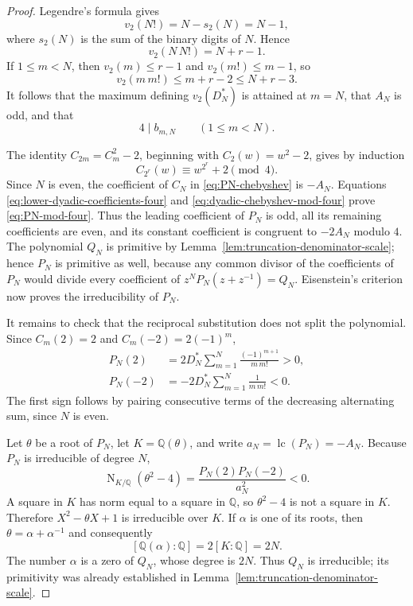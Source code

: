 \documentclass[11pt]{article}
\theoremstyle{definition}
\theoremstyle{remark}
\newcommand{\Q}{\mathbb Q}
\begin{document}
\begin{proof}
Legendre's formula gives
\[
 v_2(N!)=N-s_2(N)=N-1,
\]
where \(s_2(N)\) is the sum of the binary digits of \(N\).  Hence
\begin{equation}\label{eq:dyadic-top-valuation}
 v_2(N\,N!)=N+r-1.
\end{equation}
If \(1\leq m<N\), then \(v_2(m)\leq r-1\) and
\(v_2(m!)\leq m-1\), so
\[
 v_2(m\,m!)\leq m+r-2\leq N+r-3.
\]
It follows that the maximum defining \(v_2(D_N^*)\) is attained at
\(m=N\), that \(A_N\) is odd, and that
\begin{equation}\label{eq:lower-dyadic-coefficients-four}
 4\mid b_{m,N}\qquad(1\leq m<N).
\end{equation}

The identity \(C_{2m}=C_m^2-2\), beginning with
\(C_2(w)=w^2-2\), gives by induction
\begin{equation}\label{eq:dyadic-chebyshev-mod-four}
 C_{2^r}(w)\equiv w^{2^r}+2\pmod4.
\end{equation}
Since \(N\) is even, the coefficient of \(C_N\) in
\eqref{eq:PN-chebyshev} is \(-A_N\).  Equations
\eqref{eq:lower-dyadic-coefficients-four} and
\eqref{eq:dyadic-chebyshev-mod-four} prove
\eqref{eq:PN-mod-four}.  Thus the leading coefficient of \(P_N\) is odd,
all its remaining coefficients are even, and its constant coefficient is
congruent to \(-2A_N\) modulo \(4\).  The polynomial \(Q_N\) is primitive
by Lemma~\ref{lem:truncation-denominator-scale}; hence \(P_N\) is
primitive as well, because any common divisor of the coefficients of
\(P_N\) would divide every coefficient of \(z^NP_N(z+z^{-1})=Q_N\).
Eisenstein's criterion now proves the irreducibility of \(P_N\).

It remains to check that the reciprocal substitution does not split the
polynomial.  Since \(C_m(2)=2\) and \(C_m(-2)=2(-1)^m\),
\begin{align}
 P_N(2)
 &=2D_N^*\sum_{m=1}^N\frac{(-1)^{m+1}}{m\,m!}>0,
 \label{eq:PN-at-two-positive}\\
 P_N(-2)
 &=-2D_N^*\sum_{m=1}^N\frac{1}{m\,m!}<0.
 \label{eq:PN-at-minus-two-negative}
\end{align}
The first sign follows by pairing consecutive terms of the decreasing
alternating sum, since \(N\) is even.

Let \(\theta\) be a root of \(P_N\), let
\(K=\Q(\theta)\), and write \(a_N=\operatorname{lc}(P_N)=-A_N\).
Because \(P_N\) is irreducible of degree \(N\),
\begin{equation}\label{eq:dyadic-discriminant-norm}
 \operatorname N_{K/\Q}(\theta^2-4)
 =\frac{P_N(2)P_N(-2)}{a_N^2}<0.
\end{equation}
A square in \(K\) has norm equal to a square in \(\Q\), so
\(\theta^2-4\) is not a square in \(K\).  Therefore
\(X^2-\theta X+1\) is irreducible over \(K\).  If \(\alpha\) is one of
its roots, then \(\theta=\alpha+\alpha^{-1}\) and consequently
\[
 [\Q(\alpha):\Q]
 =2[K:\Q]=2N.
\]
The number \(\alpha\) is a zero of \(Q_N\), whose degree is \(2N\).
Thus \(Q_N\) is irreducible; its primitivity was already established in
Lemma~\ref{lem:truncation-denominator-scale}.
\end{proof}
\end{document}
